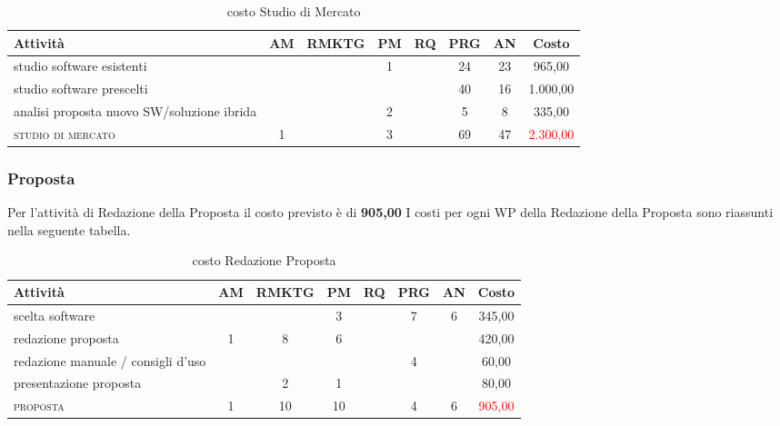 \begin{table}[!h]
\footnotesize
\centering
\begin{tabular}{|p{}|c|c|c|c|c|c|c|}
\hline
\textbf{Attività}& \textbf{AM} & \textbf{RMKTG} & \textbf{PM} & \textbf{RQ} & \textbf{PRG} & \textbf{AN} & \textbf{Costo}  \\ 
            
\hline
studio software esistenti & & & 1& & 24& 23& \text{\euro} 965,00\\
studio software prescelti	 				  & & &	&	&40 &16 & \text{\euro} 1.000,00 \\	
analisi proposta nuovo SW/soluzione ibrida 					  & & &2 & 	&5	&  8  &  	\text{\euro} 335,00 \\			  
\hline
\scshape{}studio di mercato  							& 1 &  &3 & &69	&47	&	\textcolor{red}{ \text{\euro}2.300,00 }\\		 
\hline
\end{tabular}
\caption{costo Studio di Mercato}\label{tab:mercato}
\end{table}

\subsubsection{Proposta}
Per l'attività di Redazione della Proposta il costo previsto è di \textbf	{ \text{\euro} 905,00 }	
I costi per ogni WP della Redazione della Proposta sono riassunti nella seguente tabella.

\begin{table}[!h]
\footnotesize
\centering
\begin{tabular}{|p{}|c|c|c|c|c|c|c|}
\hline
\textbf{Attività}& \textbf{AM} & \textbf{RMKTG} & \textbf{PM} & \textbf{RQ} & \textbf{PRG} & \textbf{AN} & \textbf{Costo}  \\ 
\hline
scelta software			& & & 3&	& 7&	6& 	\text{\euro} 345,00 \\
redazione proposta & 1&	8&	6& & & & 	 \text{\euro} 420,00 \\
redazione manuale / consigli d'uso & & & & & 					4 && 	\text{\euro} 60,00 \\	
presentazione proposta		 & & 2&  	1	& & 	& & 		 \text{\euro} 80,00 \\	
\hline
\scshape{}proposta  							& 1  &10 &10& &	4&	6&	\textcolor{red}{ \text{\euro} 905,00 }\\		 
\hline
\end{tabular}
\caption{costo Redazione Proposta}\label{tab:proposta}
\end{table}	
	
